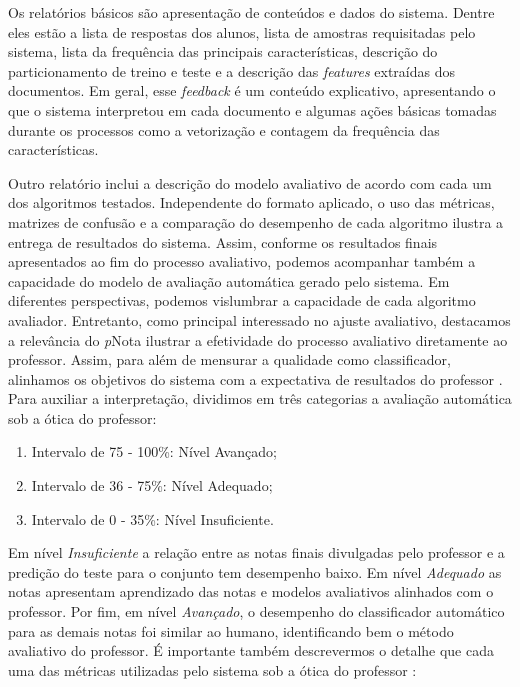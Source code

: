 Os relatórios básicos são apresentação de conteúdos e dados do sistema. Dentre eles estão a lista de respostas dos alunos, lista de amostras requisitadas pelo sistema, lista da frequência das principais características, descrição do particionamento de treino e teste e a descrição das \textit{features} extraídas dos documentos. Em geral, esse \textit{feedback} é um conteúdo explicativo, apresentando o que o sistema interpretou em cada documento e algumas ações básicas tomadas durante os processos como a vetorização e contagem da frequência das características.

Outro relatório inclui a descrição do modelo avaliativo de acordo com cada um dos algoritmos testados. Independente do formato aplicado, o uso das métricas, matrizes de confusão e a comparação do desempenho de cada algoritmo ilustra a entrega de resultados do sistema. Assim, conforme os resultados finais apresentados ao fim do processo avaliativo, podemos acompanhar também a capacidade do modelo de avaliação automática gerado pelo sistema. Em diferentes perspectivas, podemos vislumbrar a capacidade de cada algoritmo avaliador. Entretanto, como principal interessado no ajuste avaliativo, destacamos a relevância do \textit{p}Nota ilustrar a efetividade do processo avaliativo diretamente ao professor. Assim, para além de mensurar a qualidade como classificador, alinhamos os objetivos do sistema com a expectativa de resultados do professor \cite{nascimento2020}. Para auxiliar a interpretação, dividimos em três categorias a avaliação automática sob a ótica do professor:

\begin{enumerate}
	\item Intervalo de 75 - 100\%: Nível Avançado;
	\item Intervalo de 36 - 75\%: Nível Adequado;
	\item Intervalo de 0 - 35\%: Nível Insuficiente.
\end{enumerate}

Em nível \textit{Insuficiente} a relação entre as notas finais divulgadas pelo professor e a predição do teste para o conjunto tem desempenho baixo. Em nível \textit{Adequado} as notas apresentam aprendizado das notas e modelos avaliativos alinhados com o professor. Por fim, em nível \textit{Avançado}, o desempenho do classificador automático para as demais notas foi similar ao humano, identificando bem o método avaliativo do professor. É importante também descrevermos o detalhe que cada uma das métricas utilizadas pelo sistema sob a ótica do professor \cite{nascimento2020}:

